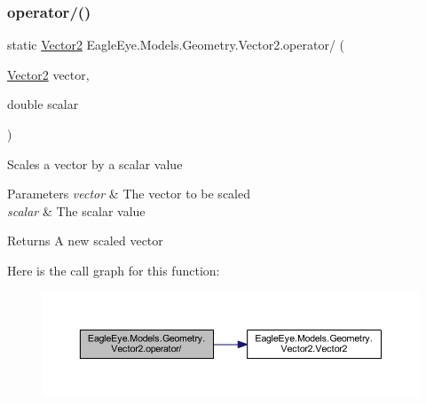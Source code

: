 \subsubsection{\texorpdfstring{operator/()}{operator/()}}
{\footnotesize\ttfamily static \mbox{\hyperlink{struct_eagle_eye_1_1_models_1_1_geometry_1_1_vector2}{Vector2}} Eagle\+Eye.\+Models.\+Geometry.\+Vector2.\+operator/ (\begin{DoxyParamCaption}\item[{\mbox{\hyperlink{struct_eagle_eye_1_1_models_1_1_geometry_1_1_vector2}{Vector2}}}]{vector,  }\item[{double}]{scalar }\end{DoxyParamCaption})\hspace{0.3cm}{\ttfamily [static]}}



Scales a vector by a scalar value 


\begin{DoxyParams}{Parameters}
{\em vector} & The vector to be scaled\\
\hline
{\em scalar} & The scalar value\\
\hline
\end{DoxyParams}
\begin{DoxyReturn}{Returns}
A new scaled vector
\end{DoxyReturn}
Here is the call graph for this function\+:\nopagebreak
\begin{figure}[H]
\begin{center}
\leavevmode
\includegraphics[width=350pt]{struct_eagle_eye_1_1_models_1_1_geometry_1_1_vector2_a4306acd1970edab7db3d8654d2eb5c9d_cgraph}
\end{center}
\end{figure}
\mbox{\label{struct_eagle_eye_1_1_models_1_1_geometry_1_1_vector2_af4c7aab632ee36849bc5ad2731cb2b86}} 
